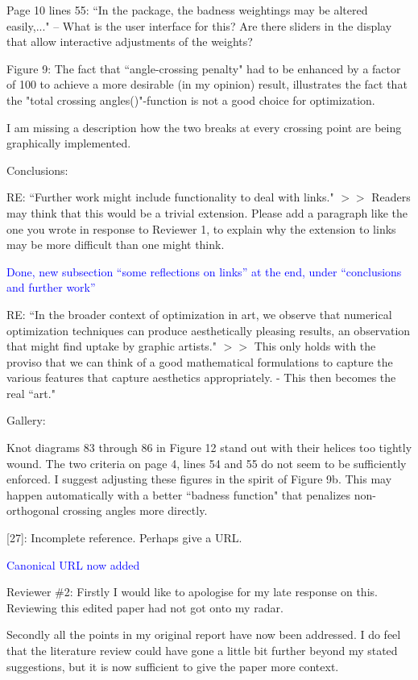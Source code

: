 \documentclass[12pt]{article}
\begin{document}
Page 10 lines 55: ``In the package, the badness weightings may be
altered easily,..."  -- What is the user interface for this?  Are
there sliders in the display that allow interactive adjustments of the
weights?

Figure 9: The fact that ``angle-crossing penalty" had to be enhanced by
a factor of 100 to achieve a more desirable (in my opinion) result,
illustrates the fact that the "total crossing angles()"-function is
not a good choice for optimization.

I am missing a description how the two breaks at every crossing point
are being graphically implemented.

Conclusions:

RE: ``Further work might include functionality to deal
with links."  $>>$ Readers may think that this would be a trivial
extension.  Please add a paragraph like the one you wrote in response
to Reviewer 1, to explain why the extension to links may be more
difficult than one might think.

\textcolor{blue}{Done, new subsection ``some reflections on links''
  at the end, under ``conclusions and further work''}

RE: ``In the broader context of optimization in art, we observe that
numerical optimization techniques can produce aesthetically pleasing
results, an observation that might find uptake by graphic artists."
$>>$ This only holds with the proviso that we can think of a good
mathematical formulations to capture the various features that capture
aesthetics appropriately.  - This then becomes the real ``art."

Gallery:

Knot diagrams 83 through 86 in Figure 12 stand out with their helices
too tightly wound.  The two criteria on page 4, lines 54 and 55 do not
seem to be sufficiently enforced.  I suggest adjusting these figures
in the spirit of Figure 9b.  This may happen automatically with a
better ``badness function" that penalizes non-orthogonal crossing
angles more directly.

[27]:  Incomplete reference.  Perhaps give a URL.

\textcolor{blue}{Canonical URL now added}


Reviewer \#2: Firstly I would like to apologise for my late response on
this. Reviewing this edited paper had not got onto my radar.

Secondly all the points in my original report have now been
addressed. I do feel that the literature review could have gone a
little bit further beyond my stated suggestions, but it is now
sufficient to give the paper more context.
\end{document}
